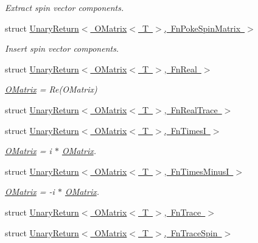 \begin{DoxyCompactItemize}
\begin{DoxyCompactList}\small\item\em Extract spin vector components. \end{DoxyCompactList}\item 
struct \mbox{\hyperlink{structENSEM_1_1UnaryReturn_3_01OMatrix_3_01T_01_4_00_01FnPokeSpinMatrix_01_4}{Unary\+Return$<$ O\+Matrix$<$ T $>$, Fn\+Poke\+Spin\+Matrix $>$}}
\begin{DoxyCompactList}\small\item\em Insert spin vector components. \end{DoxyCompactList}\item 
struct \mbox{\hyperlink{structENSEM_1_1UnaryReturn_3_01OMatrix_3_01T_01_4_00_01FnReal_01_4}{Unary\+Return$<$ O\+Matrix$<$ T $>$, Fn\+Real $>$}}
\begin{DoxyCompactList}\small\item\em \mbox{\hyperlink{classENSEM_1_1OMatrix}{O\+Matrix}} = Re(\+O\+Matrix) \end{DoxyCompactList}\item 
struct \mbox{\hyperlink{structENSEM_1_1UnaryReturn_3_01OMatrix_3_01T_01_4_00_01FnRealTrace_01_4}{Unary\+Return$<$ O\+Matrix$<$ T $>$, Fn\+Real\+Trace $>$}}
\item 
struct \mbox{\hyperlink{structENSEM_1_1UnaryReturn_3_01OMatrix_3_01T_01_4_00_01FnTimesI_01_4}{Unary\+Return$<$ O\+Matrix$<$ T $>$, Fn\+Times\+I $>$}}
\begin{DoxyCompactList}\small\item\em \mbox{\hyperlink{classENSEM_1_1OMatrix}{O\+Matrix}} = i $\ast$ \mbox{\hyperlink{classENSEM_1_1OMatrix}{O\+Matrix}}. \end{DoxyCompactList}\item 
struct \mbox{\hyperlink{structENSEM_1_1UnaryReturn_3_01OMatrix_3_01T_01_4_00_01FnTimesMinusI_01_4}{Unary\+Return$<$ O\+Matrix$<$ T $>$, Fn\+Times\+Minus\+I $>$}}
\begin{DoxyCompactList}\small\item\em \mbox{\hyperlink{classENSEM_1_1OMatrix}{O\+Matrix}} = -\/i $\ast$ \mbox{\hyperlink{classENSEM_1_1OMatrix}{O\+Matrix}}. \end{DoxyCompactList}\item 
struct \mbox{\hyperlink{structENSEM_1_1UnaryReturn_3_01OMatrix_3_01T_01_4_00_01FnTrace_01_4}{Unary\+Return$<$ O\+Matrix$<$ T $>$, Fn\+Trace $>$}}
\item 
struct \mbox{\hyperlink{structENSEM_1_1UnaryReturn_3_01OMatrix_3_01T_01_4_00_01FnTraceSpin_01_4}{Unary\+Return$<$ O\+Matrix$<$ T $>$, Fn\+Trace\+Spin $>$}}

\end{DoxyCompactItemize}
